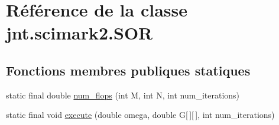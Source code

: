 \hypertarget{classjnt_1_1scimark2_1_1SOR}{\section{Référence de la classe jnt.\-scimark2.\-S\-O\-R}
\label{classjnt_1_1scimark2_1_1SOR}
}
\subsection*{Fonctions membres publiques statiques}
\begin{DoxyCompactItemize}
\item 
static final double \hyperlink{classjnt_1_1scimark2_1_1SOR_a0149ef2744ccc1d3d4804db67643583b}{num\-\_\-flops} (int M, int N, int num\-\_\-iterations)
\item 
static final void \hyperlink{classjnt_1_1scimark2_1_1SOR_aa52a59abae8229ff3552a1f6fb9c010e}{execute} (double omega, double G\mbox{[}$\,$\mbox{]}\mbox{[}$\,$\mbox{]}, int num\-\_\-iterations)
\end{DoxyCompactItemize}


